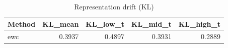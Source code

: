 \begin{table}[htbp]
\centering
\caption{Representation drift (KL)}
\label{tab:repr-drift}
\begin{tabular}{lrrrr}
\toprule
\textbf{Method} & \textbf{KL\_mean} & \textbf{KL\_low\_t} & \textbf{KL\_mid\_t} & \textbf{KL\_high\_t} \\
\midrule
ewc & 0.3937 & 0.4897 & 0.3931 & 0.2889 \\
\bottomrule
\end{tabular}
\end{table}